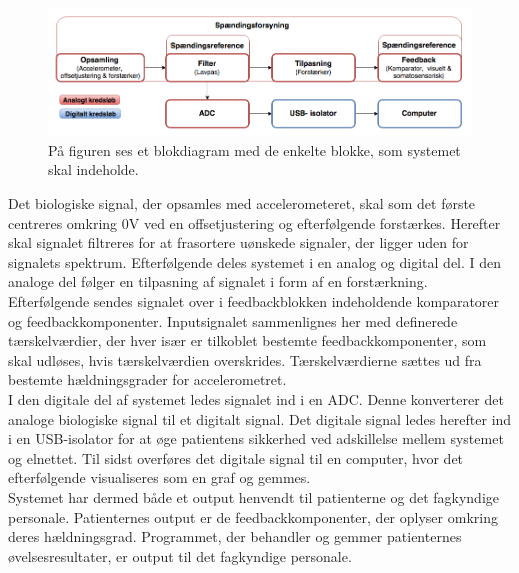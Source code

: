 \begin{figure}[H]
	\centering
	\includegraphics[scale=0.73]{figures/cProblemloesning/blokdiagram.PNG}
	\caption{På figuren ses et blokdiagram med de enkelte blokke, som systemet skal indeholde.}
	\label{kravblok}
\end{figure}
Det biologiske signal, der opsamles med accelerometeret, skal som det første centreres omkring $0$V ved en offsetjustering og efterfølgende forstærkes. Herefter skal signalet filtreres for at frasortere uønskede signaler, der ligger uden for signalets spektrum. Efterfølgende deles systemet i en analog og digital del. I den analoge del følger en tilpasning af signalet i form af en forstærkning. Efterfølgende sendes signalet over i feedbackblokken indeholdende komparatorer og feedbackkomponenter. Inputsignalet sammenlignes her med definerede tærskelværdier, der hver især er tilkoblet bestemte feedbackkomponenter, som skal udløses, hvis tærskelværdien overskrides. Tærskelværdierne sættes ud fra bestemte hældningsgrader for accelerometret. \\
I den digitale del af systemet ledes signalet ind i en ADC. Denne konverterer det analoge biologiske signal til et digitalt signal. Det digitale signal ledes herefter ind i en USB-isolator for at øge patientens sikkerhed ved adskillelse mellem systemet og elnettet. Til sidst overføres det digitale signal til en computer, hvor det efterfølgende visualiseres som en graf og gemmes. \\
Systemet har dermed både et output henvendt til patienterne og det fagkyndige personale. Patienternes output er de feedbackkomponenter, der oplyser omkring deres hældningsgrad. Programmet, der behandler og gemmer patienternes øvelsesresultater, er output til det fagkyndige personale.

